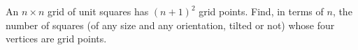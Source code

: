 An $n\times n$ grid of unit squares has $(n+1)^2$ grid points. Find, in terms of $n$, the number of squares (of any size and any orientation, tilted or not) whose four vertices are grid points.
